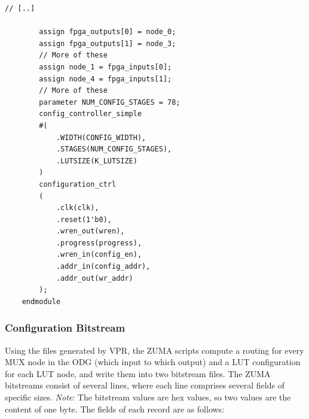 \documentclass{article}
\begin{document}
\begin{lstlisting}[style=Verilog,caption={{Example Verilog excerpt from ZUMA\_custom\_generated.v.}}, label={lst:verilog_ZUMA_custom_generated.v}]
        // [..]

        assign fpga_outputs[0] = node_0;
        assign fpga_outputs[1] = node_3;
        // More of these
        assign node_1 = fpga_inputs[0];
        assign node_4 = fpga_inputs[1];
        // More of these
        parameter NUM_CONFIG_STAGES = 78;
        config_controller_simple
        #(
            .WIDTH(CONFIG_WIDTH),
            .STAGES(NUM_CONFIG_STAGES),
            .LUTSIZE(K_LUTSIZE)
        )
        configuration_ctrl
        (
            .clk(clk),
            .reset(1'b0),
            .wren_out(wren),
            .progress(progress),
            .wren_in(config_en),
            .addr_in(config_addr),
            .addr_out(wr_addr)
        );
    endmodule

\end{lstlisting}

\subsubsection{Configuration Bitstream}
Using the files generated by VPR, the ZUMA scripts compute a routing for every MUX node in the ODG (which input to which output) and a LUT configuration for each LUT node, and write them into two bitstream files. The ZUMA bitstreams consist of several lines, where each line comprises several fields of specific sizes.
\emph{Note}: The bitstream values are hex values, so two values are the content of one byte.
The fields of each record are as follows:

\end{document}
